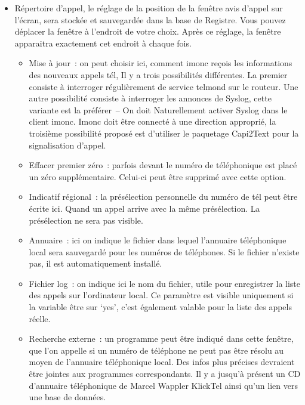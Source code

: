 \begin{itemize}
  \item Répertoire d'appel, le réglage de la position de la fenêtre avis d'appel
    sur l'écran, sera stockée et sauvegardée dans la base de Registre. Vous pouvez
    déplacer la fenêtre à l'endroit de votre choix. Après ce réglage, la fenêtre
    apparaitra exactement cet endroit à chaque fois.
    \begin{itemize}
      \item Mise à jour~: on peut choisir ici, comment imonc reçois les
        informations des nouveaux appels tél, Il y a trois possibilités différentes.
        La premier consiste à interroger régulièrement de service telmond sur le
        routeur. Une autre possibilité consiste à interroger les annonces de
        Syslog, cette variante est la préférer~-- On doit Naturellement activer
        Syslog dans le client imonc. Imonc doit être connecté à une direction approprié,
        la troisième possibilité proposé est d'utiliser le paquetage Capi2Text pour
        la signalisation d'appel.
      \item Effacer premier zéro~: parfois devant le numéro de téléphonique est
        placé un zéro supplémentaire. Celui-ci peut être supprimé avec cette option.
      \item Indicatif régional~: la présélection personnelle du numéro de tél
        peut être écrite ici. Quand un appel arrive avec la même présélection.
        La présélection ne sera pas visible.
      \item Annuaire~: ici on indique le fichier dans lequel l'annuaire
        téléphonique local sera sauvegardé pour les numéros de téléphones.
        Si le fichier n'existe pas, il est automatiquement installé.
      \item Fichier log~: on indique ici le nom du fichier, utile pour enregistrer
        la liste des appels sur l'ordinateur local. Ce paramètre est visible
        uniquement si la variable  être sur `yes', c'est
        également valable pour la liste des appels réelle.
      \item Recherche externe~: un programme peut être indiqué dans cette fenêtre,
        que l'on appelle si un numéro de téléphone ne peut pas être résolu au moyen
        de l'annuaire téléphonique local. Des infos plus précises devraient être
        jointes aux programmes correspondants. Il y a jusqu'à présent un CD
        d'annuaire téléphonique de Marcel Wappler KlickTel ainsi qu'un lien vers
        une base de données.
    \end{itemize}


\end{itemize}
